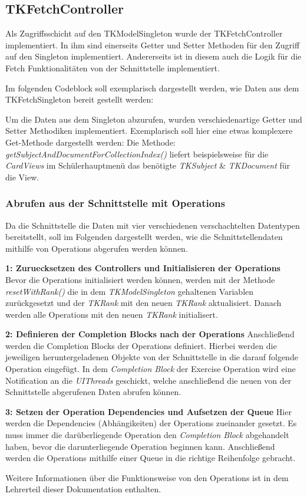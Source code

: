 \subsection{TKFetchController}
Als Zugriffsschicht auf den TKModelSingleton wurde der TKFetchController implementiert. In ihm sind einerseits Getter und Setter Methoden für den Zugriff auf den Singleton implementiert. Andererseits ist in diesem auch die Logik für die Fetch Funktionalitäten von der Schnittstelle implementiert.

Im folgenden Codeblock soll exemplarisch dargestellt werden, wie Daten aus dem TKFetchSingleton bereit gestellt werden:

Um die Daten aus dem Singleton abzurufen, wurden verschiedenartige Getter und Setter Methodiken implementiert. Exemplarisch soll hier eine etwas komplexere Get-Methode dargestellt werden:
Die Methode: \textit{getSubjectAndDocumentForCollectionIndex()} liefert beispielsweise für die \textit{CardViews} im Schülerhauptmenü das benötigte \textit{TKSubject} \& \textit{TKDocument} für die View.

\subsubsection{Abrufen aus der Schnittstelle mit Operations}
Da die Schnittstelle die Daten mit vier verschiedenen verschachtelten Datentypen bereitstellt, soll im Folgenden dargestellt werden, wie die Schnittstellendaten mithilfe von Operations abgerufen werden können.


\textbf{1: Zuruecksetzen des Controllers und Initialisieren der Operations}
Bevor die Operations initialisiert werden können, werden mit der Methode \textit{resetWithRank()} die in dem \textit{TKModelSingleton} gehaltenen Variablen zurückgesetzt und der \textit{TKRank} mit den neuen \textit{TKRank} aktualisiert. Danach werden alle Operations mit den neuen \textit{TKRank} initialisert.

\textbf{2: Definieren der Completion Blocks nach der Operations}
Anschließend werden die Completion Blocks der Operations definiert. Hierbei werden die jeweiligen heruntergeladenen Objekte von der Schnittstelle in die darauf folgende Operation eingefügt. In dem \textit{Completion Block} der Exercise Operation wird eine Notification an die \textit{UIThreads} geschickt, welche anschließend die neuen von der Schnittstelle abgerufenen Daten abrufen können.

\textbf{3: Setzen der Operation Dependencies und Aufsetzen der Queue}
Hier werden die Dependencies (Abhängikeiten) der Operations zueinander gesetzt. Es muss immer die darüberliegende Operation den \textit{Completion Block} abgehandelt haben, bevor die darunterliegende Operation beginnen kann. Anschließend werden die Operations mithilfe einer Queue in die richtige Reihenfolge gebracht.

Weitere Informationen über die Funktionsweise von den Operations ist in dem Lehrerteil dieser Dokumentation enthalten. %